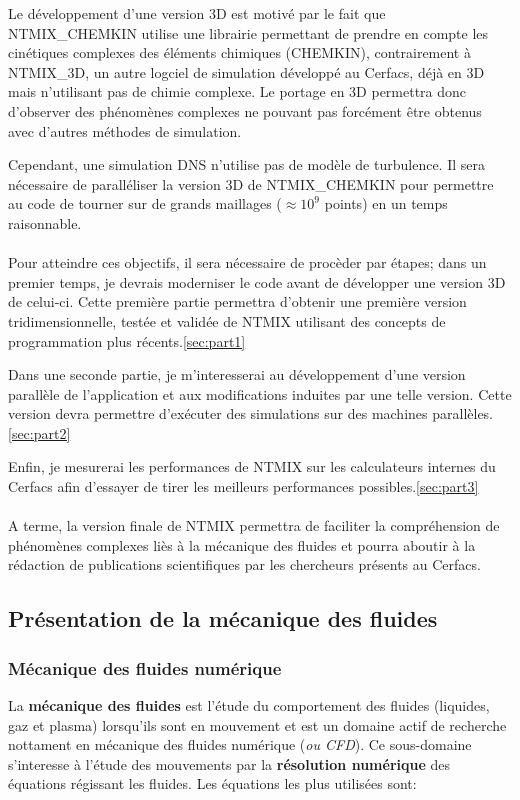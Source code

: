 Le développement d'une version 3D est motivé par le fait que NTMIX\_CHEMKIN utilise une librairie permettant de prendre en compte les cinétiques complexes des éléments chimiques (CHEMKIN), contrairement à NTMIX\_3D, un autre logciel de simulation développé au Cerfacs, déjà en 3D mais n'utilisant pas de chimie complexe. Le portage en 3D permettra donc d'observer des phénomènes complexes ne pouvant pas forcément être obtenus avec d'autres méthodes de simulation.


Cependant, une simulation DNS n'utilise pas de modèle de turbulence. Il sera nécessaire de paralléliser la version 3D de NTMIX\_CHEMKIN pour permettre au code de tourner sur de grands maillages ($\approx 10^9$ points) en un temps raisonnable.


\paragraph{}Pour atteindre ces objectifs, il sera nécessaire de procèder par étapes; dans un premier temps, je devrais moderniser le code avant de développer une version 3D de celui-ci. Cette première partie permettra d'obtenir une première version tridimensionnelle, testée et validée de NTMIX utilisant des concepts de programmation plus récents.\ref{sec:part1}

Dans une seconde partie, je m'interesserai au développement d'une version parallèle de l'application et aux modifications induites par une telle version. Cette version devra permettre d'exécuter des simulations sur des machines parallèles.\ref{sec:part2}

Enfin, je mesurerai les performances de NTMIX sur les calculateurs internes du Cerfacs afin d'essayer de tirer les meilleurs performances possibles.\ref{sec:part3}

\paragraph{}A terme, la version finale de NTMIX permettra de faciliter la compréhension de phénomènes complexes liès à la mécanique des fluides et pourra aboutir à la rédaction de publications scientifiques par les chercheurs présents au Cerfacs.

\subsection{Présentation de la mécanique des fluides}
\subsubsection{Mécanique des fluides numérique}
La \textbf{mécanique des fluides} est l'étude du comportement des fluides (liquides, gaz et plasma) lorsqu'ils sont en mouvement et est un domaine actif de recherche nottament en mécanique des fluides numérique (\textit{ou CFD}). Ce sous-domaine s'interesse à l'étude des mouvements par la \textbf{résolution numérique} des équations régissant les fluides. Les équations les plus utilisées sont:

